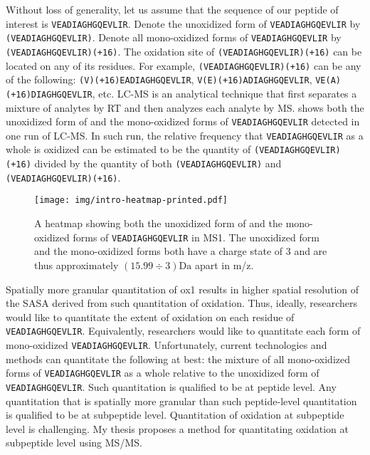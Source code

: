 Without loss of generality, let us assume that the sequence of our peptide of interest is \texttt{VEADIAGHGQEVLIR}.
Denote the unoxidized form of \texttt{VEADIAGHGQEVLIR} by \texttt{(VEADIAGHGQEVLIR)}.
Denote all \gls{mono-oxidized} forms of \texttt{VEADIAGHGQEVLIR} by \texttt{(VEADIAGHGQEVLIR)(+16)}.
The oxidation site of \texttt{(VEADIAGHGQEVLIR)(+16)} can be located on any of its residues.
For example, \texttt{(VEADIAGHGQEVLIR)(+16)} can be any of the following: 
	\texttt{(V)(+16)EADIAGHGQEVLIR}, \texttt{V(E)(+16)ADIAGHGQEVLIR}, \texttt{VE(A)(+16)DIAGHGQEVLIR}, etc.
\Gls{LC-MS} is an analytical technique that first separates a mixture of analytes by \gls{RT} and then analyzes each analyte by \gls{MS}. 
		shows both the unoxidized form of and the \gls{mono-oxidized} forms of \texttt{VEADIAGHGQEVLIR} detected in one run of \gls{LC-MS}. 
In such run, the relative frequency that \texttt{VEADIAGHGQEVLIR} as a whole is oxidized can be estimated to be
	the quantity of \texttt{(VEADIAGHGQEVLIR)(+16)} divided by the quantity of both \texttt{(VEADIAGHGQEVLIR)} and \texttt{(VEADIAGHGQEVLIR)(+16)}.
\begin{figure}
\texttt{[image: img/intro-heatmap-printed.pdf]}
\caption[
	A heatmap showing both the unoxidized form of and the \gls{mono-oxidized} forms of \texttt{VEADIAGHGQEVLIR} in \gls{MS1}.]{
	A heatmap showing both the unoxidized form of and the \gls{mono-oxidized} forms of \texttt{VEADIAGHGQEVLIR} in \gls{MS1}.
	The unoxidized form and the \gls{mono-oxidized} forms both have a charge state of 3 and are thus approximately \((15.99\div3)\si{\dalton}\) apart in \gls{m/z}.
	\label{fig:intro:heatmap-unoxidized-vs-mono-oxidized}
	}
\end{figure} 
Spatially more granular quantitation of \gls{ox1} results in higher spatial resolution of the \gls{SASA} derived from such quantitation of oxidation.
Thus, ideally, researchers would like to quantitate the extent of oxidation on each residue of \texttt{VEADIAGHGQEVLIR}.
Equivalently, researchers would like to quantitate each form of \gls{mono-oxidized} \texttt{VEADIAGHGQEVLIR}.
Unfortunately, current technologies and methods can quantitate the following at best:
	the mixture of all \gls{mono-oxidized} forms of \texttt{VEADIAGHGQEVLIR} as a whole relative to the unoxidized form of \texttt{VEADIAGHGQEVLIR}.
Such quantitation is qualified to be at peptide level. 
Any quantitation that is spatially more granular than such peptide-level quantitation is qualified to be at subpeptide level.
Quantitation of oxidation at subpeptide level is challenging.
My thesis proposes a method for quantitating oxidation at subpeptide level using \gls{MS/MS}. 

